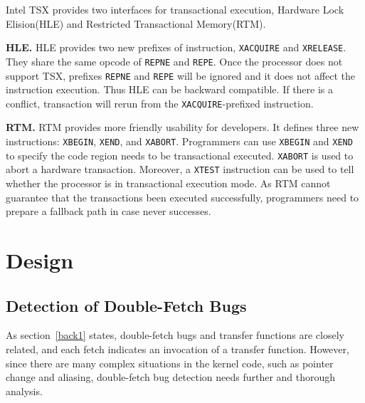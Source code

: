 \documentclass[10pt]{llncs}
\begin{document}
Intel TSX provides two interfaces for transactional execution, Hardware Lock Elision(HLE) and Restricted Transactional Memory(RTM).

\textbf{HLE.} HLE provides two new prefixes of instruction, \verb:XACQUIRE: and \verb:XRELEASE:. They share the same opcode of \verb:REPNE: and \verb:REPE:. Once the processor does not support TSX, prefixes \verb:REPNE: and \verb:REPE: will be ignored and it does not affect the instruction execution. Thus HLE can be backward compatible. If there is a conflict, transaction will rerun from the \verb:XACQUIRE:-prefixed instruction.

\textbf{RTM.} RTM provides more friendly usability for developers. It defines three new instructions: \verb:XBEGIN:, \verb:XEND:, and \verb:XABORT:. Programmers can use \verb:XBEGIN: and \verb:XEND: to specify the code region needs to be transactional executed. \verb:XABORT: is used to abort a hardware transaction. Moreover, a \verb:XTEST: instruction can be used to tell whether the processor is in transactional execution mode. As RTM cannot guarantee that the transactions been executed successfully, programmers need to prepare a fallback path in case never successes.

\section{Design}%
\label{design}

\subsection{Detection of Double-Fetch Bugs}
\label{design1}
As section~\ref{back1} states, double-fetch bugs and transfer functions are closely related, 
and each fetch indicates an invocation of a transfer function. However, since there are many 
complex situations in the kernel code, such as pointer change and aliasing, double-fetch bug 
detection needs further and thorough analysis.


\end{document}
